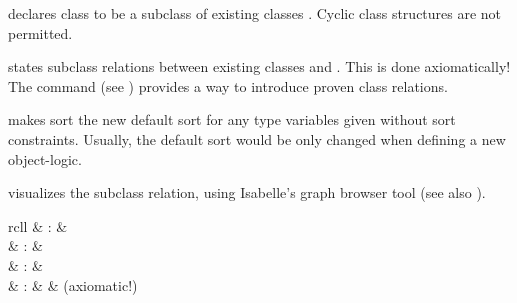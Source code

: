 \begin{isabellebody}
\begin{isamarkuptext}
  \begin{descr}

  \item [\isa{\isacommand{classes}}~\isa{c\ {\isasymsubseteq}\ c\isactrlsub {\isadigit{1}}{\isacharcomma}\ {\isasymdots}{\isacharcomma}\ c\isactrlsub n}]
  declares class  to be a subclass of existing classes .  Cyclic class structures are not permitted.

  \item [\isa{\isacommand{classrel}}~\isa{c\isactrlsub {\isadigit{1}}\ {\isasymsubseteq}\ c\isactrlsub {\isadigit{2}}}] states
  subclass relations between existing classes  and
  .  This is done axiomatically!  The  command (see ) provides a way to
  introduce proven class relations.

  \item [\isa{\isacommand{defaultsort}}~\isa{s}] makes sort  the
  new default sort for any type variables given without sort
  constraints.  Usually, the default sort would be only changed when
  defining a new object-logic.

  \item [\isa{\isacommand{class{\isacharunderscore}deps}}] visualizes the subclass relation,
  using Isabelle's graph browser tool (see also \cite{isabelle-sys}).

  \end{descr}%
\end{isamarkuptext}%
\isamarkuptrue%
%
\isamarkuptrue%
%
\begin{isamarkuptext}%
\begin{matharray}{rcll}
     & : &  \\
     & : &  \\
     & : &  \\
     & : &  & (axiomatic!) \\
  \end{matharray}


\end{isamarkuptext}
\end{isabellebody}
